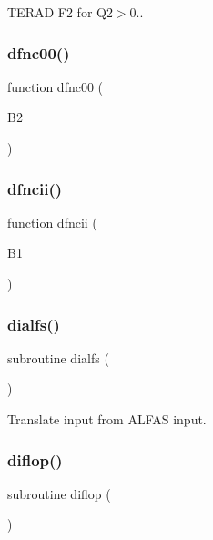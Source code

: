 T\+E\+R\+AD F2 for Q2$>$0.. 

\mbox{\label{djangoh__h_8f_a31e46a579ba814863858c9d93756893d}} 
\subsubsection{\texorpdfstring{dfnc00()}{dfnc00()}}
{\footnotesize\ttfamily function dfnc00 (\begin{DoxyParamCaption}\item[{}]{B2 }\end{DoxyParamCaption})}

\mbox{\label{djangoh__h_8f_a8423a3e922ac2752697c02850b5e3954}} 
\subsubsection{\texorpdfstring{dfncii()}{dfncii()}}
{\footnotesize\ttfamily function dfncii (\begin{DoxyParamCaption}\item[{}]{B1 }\end{DoxyParamCaption})}

\mbox{\label{djangoh__h_8f_a39c10764d264dab5d56cc9fea546fa7e}} 
\subsubsection{\texorpdfstring{dialfs()}{dialfs()}}
{\footnotesize\ttfamily subroutine dialfs (\begin{DoxyParamCaption}{ }\end{DoxyParamCaption})}



Translate input from A\+L\+F\+AS input. 

\mbox{\label{djangoh__h_8f_af3db73fbfc8ef656d8b70e305ebf58f2}} 
\subsubsection{\texorpdfstring{diflop()}{diflop()}}
{\footnotesize\ttfamily subroutine diflop (\begin{DoxyParamCaption}{ }\end{DoxyParamCaption})}



